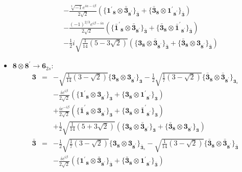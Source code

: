 \documentclass[english]{article}
\newcommand{\subcg}[3]{\big\{ {#1}\otimes{#2}\big\}^{}_{#3}}
\newcommand{\rep}[1]{\mathbf{#1}}
\begin{document}
\begin{itemize}
\begin{eqnarray*}
 & & -\frac{\sqrt[3]{-1} e^{i \alpha -i \beta }}{2 \sqrt{2}}\left(\subcg{\rep{1^{\prime}}_{\rep{8}}}{\rep{\bar{3}}_{\rep{8^{\prime}}}}{\rep{\bar{3}}}+\subcg{\rep{\bar{3}}_{\rep{8}}}{\rep{1^{\prime}}_{\rep{8^{\prime}}}}{\rep{\bar{3}}}\right) \\ 
 & & -\frac{(-1)^{2/3} e^{i \beta -i \alpha }}{2 \sqrt{2}}\left(\subcg{\rep{\bar{1}^{\prime}}_{\rep{8}}}{\rep{\bar{3}}_{\rep{8^{\prime}}}}{\rep{\bar{3}}}+\subcg{\rep{\bar{3}}_{\rep{8}}}{\rep{\bar{1}^{\prime}}_{\rep{8^{\prime}}}}{\rep{\bar{3}}}\right) \\ 
 & & -\frac{1}{2} i \sqrt{\frac{1}{14} \left(5-3 \sqrt{2}\right)}\left(\subcg{\rep{3}_{\rep{8}}}{\rep{\bar{3}}_{\rep{8^{\prime}}}}{\rep{\bar{3}}}+\subcg{\rep{\bar{3}}_{\rep{8}}}{\rep{3}_{\rep{8^{\prime}}}}{\rep{\bar{3}}}\right)
\end{eqnarray*}
\item $\rep{8}\otimes\rep{8^{\prime}}\to\rep{6}_{2s}$:
\begin{eqnarray*}
\rep{3} &=& -\sqrt{\frac{1}{14} \left(3-\sqrt{2}\right)}\subcg{\rep{3}_{\rep{8}}}{\rep{3}_{\rep{8^{\prime}}}}{\rep{3}}-\frac{1}{2} \sqrt{\frac{1}{7} \left(3-\sqrt{2}\right)}\subcg{\rep{\bar{3}}_{\rep{8}}}{\rep{\bar{3}}_{\rep{8^{\prime}}}}{\rep{3}_{s}} \\ 
 & & -\frac{i e^{i \beta }}{2 \sqrt{2}}\left(\subcg{\rep{1^{\prime}}_{\rep{8}}}{\rep{3}_{\rep{8^{\prime}}}}{\rep{3}}+\subcg{\rep{3}_{\rep{8}}}{\rep{1^{\prime}}_{\rep{8^{\prime}}}}{\rep{3}}\right) \\ 
 & & +\frac{i e^{-i \beta }}{2 \sqrt{2}}\left(\subcg{\rep{\bar{1}^{\prime}}_{\rep{8}}}{\rep{3}_{\rep{8^{\prime}}}}{\rep{3}}+\subcg{\rep{3}_{\rep{8}}}{\rep{\bar{1}^{\prime}}_{\rep{8^{\prime}}}}{\rep{3}}\right) \\ 
 & & +\frac{1}{2} \sqrt{\frac{1}{14} \left(5+3 \sqrt{2}\right)}\left(\subcg{\rep{3}_{\rep{8}}}{\rep{\bar{3}}_{\rep{8^{\prime}}}}{\rep{3}}+\subcg{\rep{\bar{3}}_{\rep{8}}}{\rep{3}_{\rep{8^{\prime}}}}{\rep{3}}\right)
\\
\rep{\bar{3}} &=& -\frac{1}{2} \sqrt{\frac{1}{7} \left(3-\sqrt{2}\right)}\subcg{\rep{3}_{\rep{8}}}{\rep{3}_{\rep{8^{\prime}}}}{\rep{\bar{3}}_{s}}-\sqrt{\frac{1}{14} \left(3-\sqrt{2}\right)}\subcg{\rep{\bar{3}}_{\rep{8}}}{\rep{\bar{3}}_{\rep{8^{\prime}}}}{\rep{\bar{3}}} \\ 
 & & -\frac{i e^{i \beta }}{2 \sqrt{2}}\left(\subcg{\rep{1^{\prime}}_{\rep{8}}}{\rep{\bar{3}}_{\rep{8^{\prime}}}}{\rep{\bar{3}}}+\subcg{\rep{\bar{3}}_{\rep{8}}}{\rep{1^{\prime}}_{\rep{8^{\prime}}}}{\rep{\bar{3}}}\right) \\ 

\end{eqnarray*}
\end{itemize}
\end{document}
